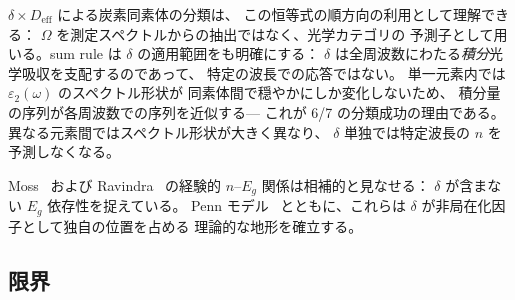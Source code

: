 \documentclass[twocolumn,showpacs,preprintnumbers,amsmath,amssymb,prb]{revtex4-2}
\begin{document}
$\delta \times D_\mathrm{eff}$ による炭素同素体の分類は、
この恒等式の順方向の利用として理解できる：
$\Omega$ を測定スペクトルからの抽出ではなく、光学カテゴリの
予測子として用いる。sum rule は $\delta$ の適用範囲をも明確にする：
$\delta$ は全周波数にわたる\emph{積分}光学吸収を支配するのであって、
特定の波長での応答ではない。
単一元素内では $\varepsilon_2(\omega)$ のスペクトル形状が
同素体間で穏やかにしか変化しないため、
積分量の序列が各周波数での序列を近似する---
これが 6/7 の分類成功の理由である。
異なる元素間ではスペクトル形状が大きく異なり、
$\delta$ 単独では特定波長の $n$ を予測しなくなる。

Moss~\cite{Moss1950} および Ravindra~\cite{Ravindra2007}
の経験的 $n$--$E_g$ 関係は相補的と見なせる：
$\delta$ が含まない $E_g$ 依存性を捉えている。
Penn モデル~\cite{Penn1962} とともに、これらは
$\delta$ が非局在化因子として独自の位置を占める
理論的な地形を確立する。

\subsection{限界}
\end{document}
